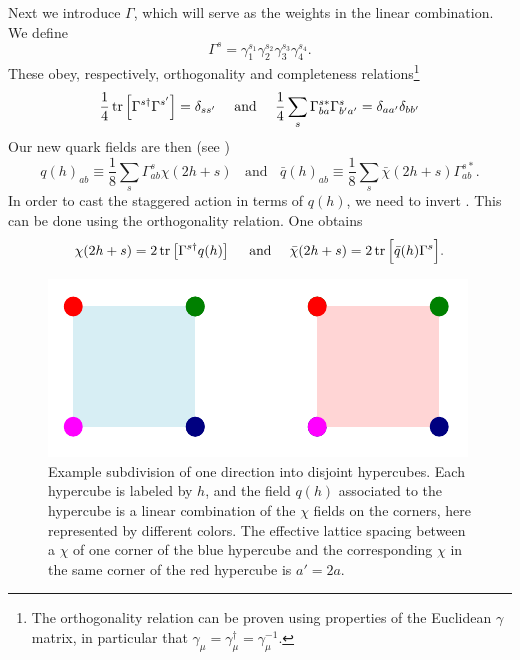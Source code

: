 Next we introduce $\Gamma$, which will serve as the weights in the linear
combination. We define
\begin{equation}
  \Gamma^s=\gamma_1^{s_1}\gamma_2^{s_2}\gamma_3^{s_3}\gamma_4^{s_4}.
\end{equation}
These obey, respectively, orthogonality and completeness 
relations\footnote{The orthogonality relation can be proven using
properties of the Euclidean $\gamma$ matrix, in particular that
$\gamma_\mu=\gamma_\mu^\dagger=\gamma_\mu^{-1}$.} 
\begin{equation}
\frac{1}{4}\tr\left[\Gamma^{s\dagger}\Gamma^{s'}\right]=\delta_{ss'}
~~~~\text{and}~~~~
\frac{1}{4}\sum_s\Gamma_{ba}^{s*}\Gamma_{b'a'}^s=\delta_{aa'}\delta_{bb'}
\end{equation}
Our new quark fields are then (see )
\begin{equation}\label{eq:staggqdef}
  q(h)_{ab}\equiv\frac{1}{8}\sum_s\Gamma^s_{ab}\chi(2h+s)
~~~~\text{and}~~~~
  \bar{q}(h)_{ab}\equiv\frac{1}{8}\sum_s\bar{\chi}(2h+s)\Gamma^{s*}_{ab}.
\end{equation}
In order to cast the staggered action in terms of $q(h)$, we need to
invert . This can be done using the
orthogonality relation. One obtains
\begin{equation}
  \chi(2h+s)=2\tr\left[\Gamma^{s\dagger}q(h)\right]
  ~~~~\text{and}~~~~
  \bar{\chi}(2h+s)=2\tr\Big[\bar{q}(h)\Gamma^s\Big].
\end{equation}

\begin{figure}[t]
  \centering
  \includegraphics{figs/staggHypercubes.pdf}
  \caption{Example subdivision of one direction into disjoint hypercubes.
           Each hypercube is labeled by $h$, and the field $q(h)$
           associated to the hypercube is a linear combination of the
           $\chi$ fields on the corners, here represented by
           different colors. The effective lattice spacing between
           a $\chi$ of one corner of the blue hypercube and the corresponding
           $\chi$ in the same corner of the red hypercube is $a'=2a$.
           }
  \label{fig:staggHypercubes}
\end{figure}


